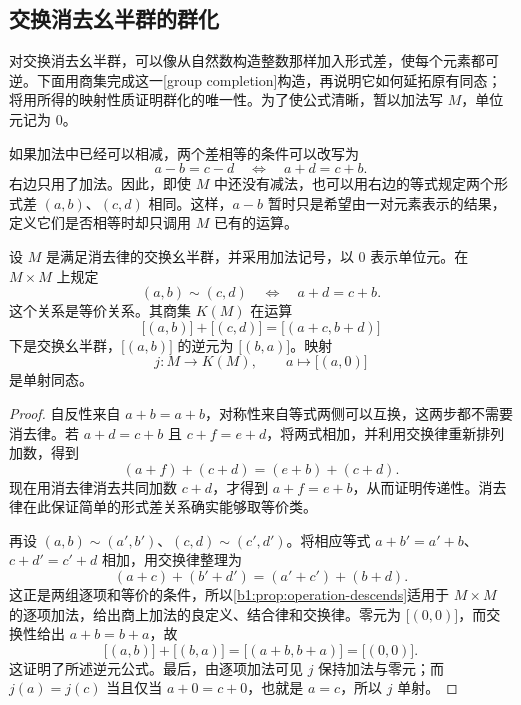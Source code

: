 \subsection{交换消去幺半群的群化}
\label{b1:subsec:0103:04}

对交换消去幺半群，可以像从自然数构造整数那样加入形式差，使每个元素都可逆。下面用商集完成这一[group completion]构造，再说明它如何延拓原有同态；将用所得的映射性质证明群化的唯一性。为了使公式清晰，暂以加法写 \(M\)，单位元记为 \(0\)。

\ProseParagraphBreak
如果加法中已经可以相减，两个差相等的条件可以改写为
\[
	a-b=c-d\quad\Longleftrightarrow\quad a+d=c+b.
\]
右边只用了加法。因此，即使 \(M\) 中还没有减法，也可以用右边的等式规定两个形式差 \((a,b)\)、\((c,d)\) 相同。这样，\(a-b\) 暂时只是希望由一对元素表示的结果，定义它们是否相等时却只调用 \(M\) 已有的运算。

\begin{proposition}[交换消去幺半群的群化]\label{b1:prop:commutative-completion}
	设 \(M\) 是满足消去律的交换幺半群，并采用加法记号，以 \(0\) 表示单位元。在 \(M\times M\) 上规定
	\[
		(a,b)\sim(c,d)\quad\Longleftrightarrow\quad a+d=c+b.
	\]
	这个关系是等价关系。其商集 \(K(M)\) 在运算
	\[
		\bigl[(a,b)\bigr]+\bigl[(c,d)\bigr]=\bigl[(a+c,b+d)\bigr]
	\]
	下是交换幺半群，\(\bigl[(a,b)\bigr]\) 的逆元为 \(\bigl[(b,a)\bigr]\)。映射
	\[
		j:M\longrightarrow K(M),\qquad a\longmapsto\bigl[(a,0)\bigr]
	\]
	是单射同态。
\end{proposition}

\begin{proof}
	自反性来自 \(a+b=a+b\)，对称性来自等式两侧可以互换，这两步都不需要消去律。若 \(a+d=c+b\) 且 \(c+f=e+d\)，将两式相加，并利用交换律重新排列加数，得到
	\[
		(a+f)+(c+d)=(e+b)+(c+d).
	\]
	现在用消去律消去共同加数 \(c+d\)，才得到 \(a+f=e+b\)，从而证明传递性。消去律在此保证简单的形式差关系确实能够取等价类。

	再设 \((a,b)\sim(a',b')\)、\((c,d)\sim(c',d')\)。将相应等式 \(a+b'=a'+b\)、\(c+d'=c'+d\) 相加，用交换律整理为
	\[
		(a+c)+(b'+d')=(a'+c')+(b+d).
	\]
	这正是两组逐项和等价的条件，所以\cref{b1:prop:operation-descends}适用于 \(M\times M\) 的逐项加法，给出商上加法的良定义、结合律和交换律。零元为 \(\bigl[(0,0)\bigr]\)，而交换性给出 \(a+b=b+a\)，故
	\[
		\bigl[(a,b)\bigr]+\bigl[(b,a)\bigr] =\bigl[(a+b,b+a)\bigr]=\bigl[(0,0)\bigr].
	\]
	这证明了所述逆元公式。最后，由逐项加法可见 \(j\) 保持加法与零元；而 \(j(a)=j(c)\) 当且仅当 \(a+0=c+0\)，也就是 \(a=c\)，所以 \(j\) 单射。
\end{proof}

